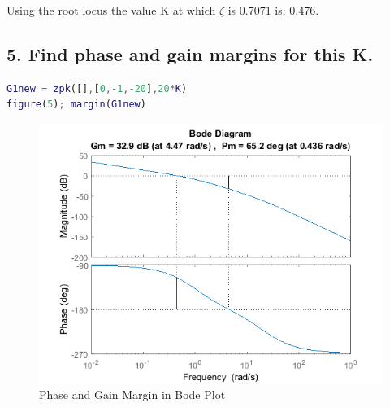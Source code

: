 {%

%
%
Using the root locus the value K at which $\zeta$ is 0.7071 is: 0.476. 


\subsection*{5. Find phase and gain margins for this K.}


\begin{lstlisting}[language = Matlab,frame=single,caption={}]
G1new = zpk([],[0,-1,-20],20*K)
figure(5); margin(G1new)
\end{lstlisting}
    
\begin{figure}[ht]
	\centering
	\includegraphics [width=0.7\linewidth]{ELEC460A1_05.png}
	\caption{Phase and Gain Margin in Bode Plot}
\end{figure}


}

